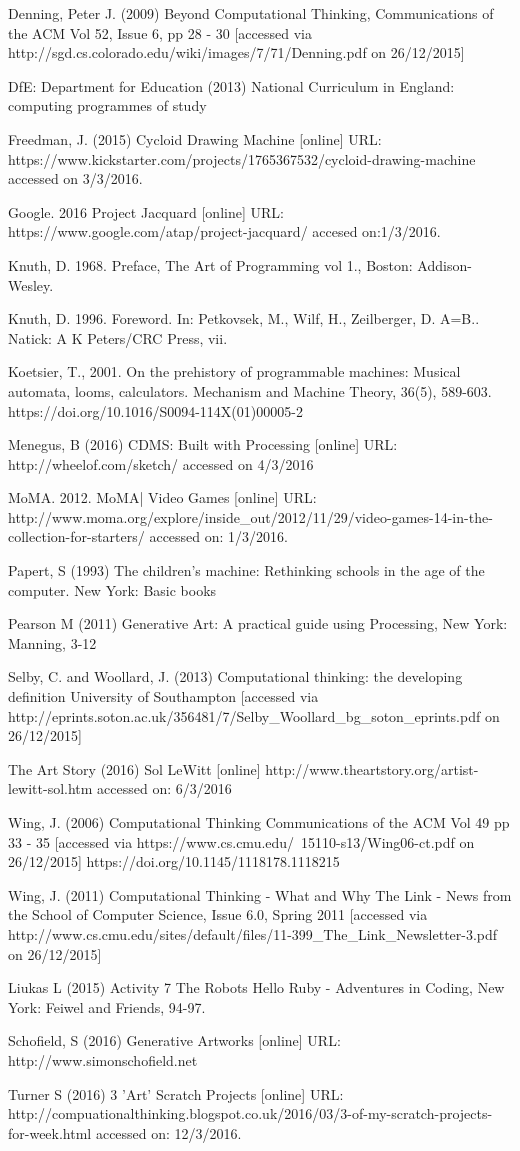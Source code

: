 \documentclass[krantz1,ChapterTOCs, book]{krantz}
\begin{document}
Denning, Peter J. (2009) Beyond Computational Thinking, Communications of the ACM Vol 52, Issue 6, pp 28 - 30 [accessed via http://sgd.cs.colorado.edu/wiki/images/7/71/Denning.pdf on 26/12/2015]
 
DfE: Department for Education (2013) National Curriculum in England: computing programmes of study
 
Freedman, J. (2015) Cycloid Drawing Machine [online] URL: https://www.kickstarter.com/projects/1765367532/cycloid-drawing-machine accessed on 3/3/2016.
 
Google. 2016 Project Jacquard [online] URL: https://www.google.com/atap/project-jacquard/ accesed on:1/3/2016.
 
Knuth, D. 1968. Preface, The Art of Programming vol 1., Boston: Addison-Wesley.
 
Knuth, D. 1996. Foreword. In: Petkovsek, M., Wilf, H., Zeilberger, D. A=B.. Natick: A K Peters/CRC Press, vii.
 
Koetsier, T., 2001. On the prehistory of programmable machines: Musical automata, looms, calculators. Mechanism and Machine Theory, 36(5), 589-603.
https://doi.org/10.1016/S0094-114X(01)00005-2
 
Menegus, B (2016) CDMS: Built with Processing [online] URL: http://wheelof.com/sketch/ accessed on 4/3/2016
 
MoMA. 2012. MoMA| Video Games [online] URL: http://www.moma.org/explore/inside_out/2012/11/29/video-games-14-in-the-collection-for-starters/ accessed on: 1/3/2016.
 
Papert, S (1993) The children's machine: Rethinking schools in the age of the computer. New York: Basic books
 
Pearson M (2011) Generative Art: A practical guide using Processing, New York: Manning, 3-12
 
Selby, C. and Woollard, J. (2013) Computational thinking: the developing definition University of Southampton [accessed via http://eprints.soton.ac.uk/356481/7/Selby_Woollard_bg_soton_eprints.pdf on 26/12/2015]
 
The Art Story (2016) Sol LeWitt [online] http://www.theartstory.org/artist-lewitt-sol.htm accessed on: 6/3/2016
 
Wing, J. (2006) Computational Thinking Communications of the ACM Vol 49 pp 33 - 35 [accessed via https://www.cs.cmu.edu/~15110-s13/Wing06-ct.pdf on 26/12/2015]
https://doi.org/10.1145/1118178.1118215
 
Wing, J. (2011) Computational Thinking - What and Why The Link - News from the School of Computer Science, Issue 6.0, Spring 2011 [accessed via http://www.cs.cmu.edu/sites/default/files/11-399_The_Link_Newsletter-3.pdf on 26/12/2015]
 
Liukas L (2015) Activity 7 The Robots Hello Ruby - Adventures in Coding, New York: Feiwel and Friends, 94-97.
 
Schofield, S (2016) Generative Artworks [online] URL: http://www.simonschofield.net
 
Turner S (2016) 3 'Art' Scratch Projects [online] URL: http://compuationalthinking.blogspot.co.uk/2016/03/3-of-my-scratch-projects-for-week.html accessed on: 12/3/2016.

\printindex
\end{document}
